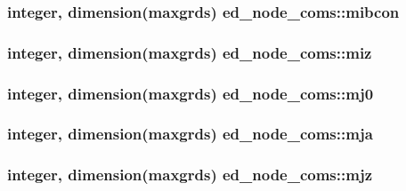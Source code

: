 \subsubsection[{\texorpdfstring{mibcon}{mibcon}}]{\setlength{\rightskip}{0pt plus 5cm}integer, dimension(maxgrds) ed\+\_\+node\+\_\+coms\+::mibcon}\hypertarget{namespaceed__node__coms_af8cf428b242766c5d3114bd5053ce26d}{}\label{namespaceed__node__coms_af8cf428b242766c5d3114bd5053ce26d}
\subsubsection[{\texorpdfstring{miz}{miz}}]{\setlength{\rightskip}{0pt plus 5cm}integer, dimension(maxgrds) ed\+\_\+node\+\_\+coms\+::miz}\hypertarget{namespaceed__node__coms_a84a2e967ef52e0e39e711d4eef30683e}{}\label{namespaceed__node__coms_a84a2e967ef52e0e39e711d4eef30683e}
\subsubsection[{\texorpdfstring{mj0}{mj0}}]{\setlength{\rightskip}{0pt plus 5cm}integer, dimension(maxgrds) ed\+\_\+node\+\_\+coms\+::mj0}\hypertarget{namespaceed__node__coms_ad774b942f26ad9d0946e2b3be5e69851}{}\label{namespaceed__node__coms_ad774b942f26ad9d0946e2b3be5e69851}
\subsubsection[{\texorpdfstring{mja}{mja}}]{\setlength{\rightskip}{0pt plus 5cm}integer, dimension(maxgrds) ed\+\_\+node\+\_\+coms\+::mja}\hypertarget{namespaceed__node__coms_a7c23d30331ab985adf33e7e0abaca9d7}{}\label{namespaceed__node__coms_a7c23d30331ab985adf33e7e0abaca9d7}
\subsubsection[{\texorpdfstring{mjz}{mjz}}]{\setlength{\rightskip}{0pt plus 5cm}integer, dimension(maxgrds) ed\+\_\+node\+\_\+coms\+::mjz}\hypertarget{namespaceed__node__coms_aa271449af5bbb67875d63c1c3a974905}{}\label{namespaceed__node__coms_aa271449af5bbb67875d63c1c3a974905}
